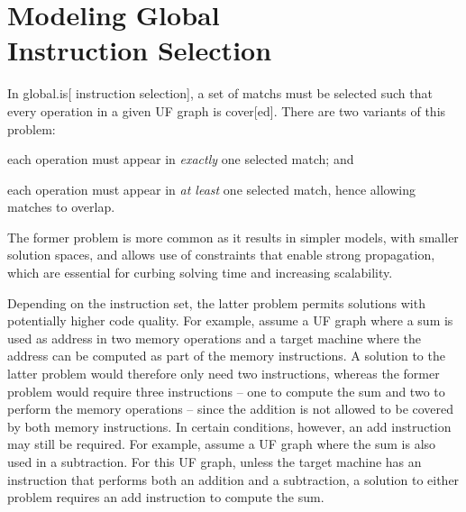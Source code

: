 %

\chapter[Modeling Global Instruction Selection]
        {Modeling Global\\ Instruction Selection}

In \gls{global.is}[ \gls{instruction selection}], a set of \glspl{match} must be
selected such that every \gls{operation} in a given \gls{UF graph} is
\gls{cover}[ed].
%
There are two variants of this problem:
%
\begin{enumerate*}[label=(\arabic*)]
  \item each \gls{operation} must appear in \emph{exactly} one selected
    \gls{match}; and
%
  \item each \gls{operation} must appear in \emph{at least} one selected
    \gls{match}, hence allowing matches to \gls{overlap}.
\end{enumerate*}
%
The former problem is more common as it results in simpler models, with smaller
\glspl{solution space}, and allows use of \glspl{constraint} that enable strong
\gls{propagation}, which are essential for curbing solving time and increasing
scalability.

Depending on the \gls{instruction set}, the latter problem permits
\glspl{solution} with potentially higher code quality.
%
For example, assume a \gls{UF graph} where a sum is used as address in two
memory operations and a \gls{target machine} where the address can be computed
as part of the memory instructions.
%
A \gls{solution} to the latter problem would therefore only need two
instructions, whereas the former problem would require three instructions -- one
to compute the sum and two to perform the memory operations -- since the
addition is not allowed to be covered by both memory instructions.
%
In certain conditions, however, an add instruction may still be required.
%
For example, assume a \gls{UF graph} where the sum is also used in a
subtraction.
%
For this \gls{UF graph}, unless the \gls{target machine} has an instruction that
performs both an addition and a subtraction, a \gls{solution} to either problem
requires an add instruction to compute the sum.

